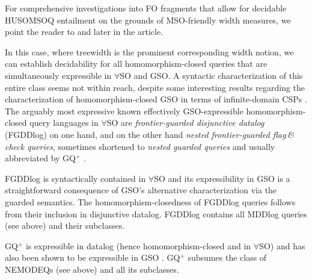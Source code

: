 For comprehensive investigations into FO fragments that allow for decidable HUSOMSOQ entailment on the grounds of MSO-friendly width measures, we point the reader to  and  later in the article.

\medskip {}
In this case, where treewidth is the prominent corresponding width notion, we can establish decidability for all homomorphism-closed queries that are simultaneously expressible in $\forall$SO and GSO. A syntactic characterization of this entire class seems not within reach, despite
some interesting results regarding the characterization of homomorphism-closed GSO in terms of infinite-domain CSPs \cite[Cor. 21]{abs-2010-05677}.   
The arguably most expressive known effectively GSO-expressible homomorphism-closed query languages in $\forall$SO are \emph{frontier-guarded disjunctive datalog} (FGDDlog) on one hand, and on the other hand \emph{nested frontier-guarded flag\,\&\,check queries}, sometimes shortened to \emph{nested guarded queries} and usually abbreviated by GQ$^+$ \cite{BourhisKR15}. 

FGDDlog is syntactically contained in $\forall$SO and its expressibility in GSO is a straightforward consequence of GSO's alternative characterization via the guarded semantics. The homomorphism-closedness of FGDDlog queries follows from their inclusion in disjunctive datalog.
FGDDlog contains all MDDlog queries (see above) and their subclasses. 

GQ$^+$ is expressible in datalog (hence homomorphism-closed and in $\forall$SO) \cite{BourhisKR15} and has also been shown to be expressible in GSO \cite[Prop. 47]{abs-2010-05677}. GQ$^+$ subsumes the class of NEMODEQs (see above) and all its subclasses.    

